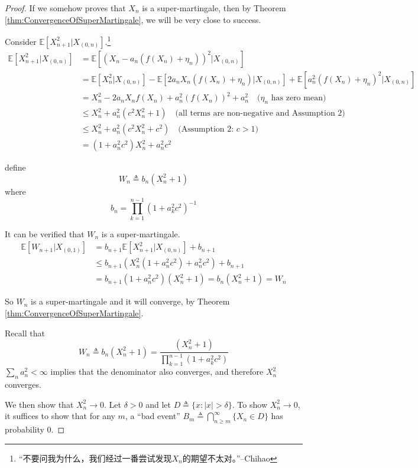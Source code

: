     \begin{proof}
        If we somehow proves that $X_n$ is a super-martingale, then by Theorem \ref{thm:ConvergenceOfSuperMartingale}, we will be very close to success.

        Consider $\mathbb{E}[X_{n+1}^2 | X_{(0,n)}]$.\footnote{“不要问我为什么，我们经过一番尝试发现$X_n$的期望不太对。”--Chihao}
        \begin{align*}
            \mathbb{E}[X_{n+1}^2|X_{(0,n)}] &= \mathbb{E}[(X_n - a_n(f(X_n) + \eta_n))^2 | X_{(0,n)}]\\
            &= \mathbb{E}[X_n^2|X_{(0,n)}] - \mathbb{E}[2a_nX_n(f(X_n)+\eta_n)|X_{(0,n)}] + \mathbb{E}[a_n^2(f(X_n) + \eta_n)^2|X_{(0,n)}]\\
            &= X_n^2 - 2a_nX_nf(X_n) + a_n^2(f(X_n))^2 + a_n^2 \quad \text{($\eta_n$ has zero mean)}\\
            &\le X_n^2 + a_n^2\left(c^2 X_n^2 + 1\right) \quad \text{(all terms are non-negative and Assumption 2)}\\
            &\le X_n^2 + a_n^2\left(c^2 X_n^2 + c^2\right) \quad \text{(Assumption 2: $c > 1$)}\\
            &= \left( 1 + a_n^2c^2 \right)X_n^2 + a_n^2c^2
        \end{align*}
        
        define
        \[ W_n \triangleq b_n(X_n^2 + 1) \]
        where
        \[ b_n = \prod_{k=1}^{n-1}(1 + a_k^2 c^2)^{-1} \]

        It can be verified that $W_n$ is a super-martingale.
        \begin{align*}
            \mathbb{E}[W_{n+1}|X_{(0,1)}] &= b_{n+1}\mathbb{E}[X_{n+1}^2|X_{(0,n)}] + b_{n+1}\\
            &\le b_{n+1}\left( X_n^2 \left( 1+a_n^2c^2 \right) + a_n^2c^2 \right) + b_{n+1}\\
            &= b_{n+1}(1+a_n^2c^2)(X_n^2+1) = b_n(X_n^2+1) = W_n
        \end{align*}

        So $W_n$ is a super-martingale and it will converge, by Theorem \ref{thm:ConvergenceOfSuperMartingale}.

        Recall that
        \[ W_n \triangleq b_n(X_n^2 + 1) = \frac{(X_n^2 + 1)}{\prod_{k=1}^{n-1}(1 + a_k^2 c^2)} \]
        $\sum_n a_n^2 < \infty$ implies that the denominator also converges, and therefore $X_n^2$ converges.

        We then show that $X_n^2 \to 0$. Let $\delta > 0$ and let $D \triangleq \{x:|x| > \delta\}$. To show $X_n^2 \to 0$, it suffices to show that for any $m$, a ``bad event'' $B_m \triangleq \bigcap_{n \ge m}^{\infty} \{X_n \in D\}$ has probability 0.


\end{proof}
